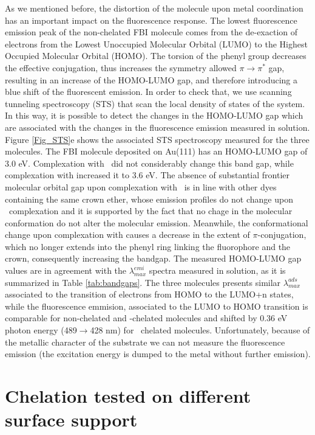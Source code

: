 \documentclass[aps,prl,reprint,longbibliography,superscriptaddress, english]{revtex4-1}
\begin{document}
As we mentioned before, the distortion of the molecule upon metal coordination has an important impact on the fluorescence response. The lowest fluorescence emission peak of the non-chelated FBI molecule comes from the de-exaction of electrons from the Lowest Unoccupied Molecular Orbital (LUMO) to the Highest Occupied Molecular Orbital (HOMO). The torsion of the phenyl group decreases the effective conjugation, thus increases the symmetry allowed $\pi \rightarrow \pi^*$ gap, resulting in an increase of the HOMO-LUMO gap, and therefore introducing a blue shift of the fluorescent emission. In order to check that, we use scanning tunneling spectroscopy (STS) that scan the local density of states of the system. In this way, it is possible to detect the changes in the HOMO-LUMO gap which are associated with the changes in the fluorescence emission measured in solution. Figure {\ref{Fig_STS}e} shows the associated STS spectroscopy measured for the three molecules. The FBI molecule deposited on Au(111) has an HOMO-LUMO gap of 3.0 eV. Complexation with \Nap\ did not considerably change this band gap, while complexation with \Bapp increased it to 3.6 eV. The absence of substantial frontier molecular orbital gap upon complexation with \Nap\ is in line with other dyes containing the same crown ether, whose emission profiles do not change upon \Nap\ complexation\cite{ast_high_2011} and it is supported by the fact that no chage in the molecular conformation do not alter the molecular emission. Meanwhile, the conformational change upon complexation with \Bapp causes a decrease in the extent of $\pi$-conjugation, which no longer extends into the phenyl ring linking the fluorophore and the crown, consequently increasing the bandgap.  The measured HOMO-LUMO gap values are in agreement with the $\lambda^{emi}_{max}$ spectra measured in solution, as it is summarized in Table \ref{tab:bandgaps}. The three molecules presents similar $\lambda^{ads}_{max}$ associated to the transition of electrons from HOMO to the LUMO+n states, while the fluorescence emmision, associated to the LUMO to HOMO transition is comparable for non-chelated and \Nap-chelated molecules and shifted by 0.36 eV photon energy (489$\rightarrow$428 nm) for \Bapp\ chelated molecules. Unfortunately, because of the metallic character of the substrate we can not measure the fluorescence emission (the excitation energy is dumped to the metal without further emission). 


\section{Chelation tested on different surface support}
\end{document}
